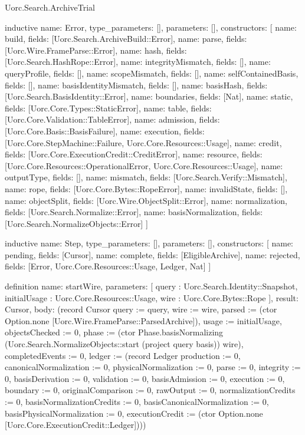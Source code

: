 \begin{lexlean}{Uorc.Search.ArchiveTrial}
\begin{semanticmodule}
inductive{
  name: Error,
  type_parameters: [],
  parameters: [],
  constructors: [
    {name: build, fields: [Uorc.Search.ArchiveBuild::Error]},
    {name: parse, fields: [Uorc.Wire.FrameParse::Error]},
    {name: hash, fields: [Uorc.Search.HashRope::Error]},
    {name: integrityMismatch, fields: []},
    {name: queryProfile, fields: []},
    {name: scopeMismatch, fields: []},
    {name: selfContainedBasis, fields: []},
    {name: basisIdentityMismatch, fields: []},
    {name: basisHash, fields: [Uorc.Search.BasisIdentity::Error]},
    {name: boundaries, fields: [Nat]},
    {name: static, fields: [Uorc.Core.Types::StaticError]},
    {name: table, fields: [Uorc.Core.Validation::TableError]},
    {name: admission, fields: [Uorc.Core.Basis::BasisFailure]},
    {name: execution, fields: [Uorc.Core.StepMachine::Failure, Uorc.Core.Resources::Usage]},
    {name: credit, fields: [Uorc.Core.ExecutionCredit::CreditError]},
    {name: resource, fields: [Uorc.Core.Resources::OperationalError, Uorc.Core.Resources::Usage]},
    {name: outputType, fields: []},
    {name: mismatch, fields: [Uorc.Search.Verify::Mismatch]},
    {name: rope, fields: [Uorc.Core.Bytes::RopeError]},
    {name: invalidState, fields: []},
    {name: objectSplit, fields: [Uorc.Wire.ObjectSplit::Error]},
    {name: normalization, fields: [Uorc.Search.Normalize::Error]},
    {name: basisNormalization, fields: [Uorc.Search.NormalizeObjects::Error]}
  ]
}

inductive{
  name: Step,
  type_parameters: [],
  parameters: [],
  constructors: [
    {name: pending, fields: [Cursor]},
    {name: complete, fields: [EligibleArchive]},
    {name: rejected, fields: [Error, Uorc.Core.Resources::Usage, Ledger, Nat]}
  ]
}

definition{
  name: startWire,
  parameters: [
    query : Uorc.Search.Identity::Snapshot,
    initialUsage : Uorc.Core.Resources::Usage,
    wire : Uorc.Core.Bytes::Rope
  ],
  result: Cursor,
  body: (record Cursor {query := query, wire := wire, parsed := (ctor Option.none [Uorc.Wire.FrameParse::ParsedArchive]), usage := initialUsage, objectsChecked := 0, phase := (ctor Phase.basisNormalizing (Uorc.Search.NormalizeObjects::start (project query basis)) wire), completedEvents := 0, ledger := (record Ledger {production := 0, canonicalNormalization := 0, physicalNormalization := 0, parse := 0, integrity := 0, basisDerivation := 0, validation := 0, basisAdmission := 0, execution := 0, boundary := 0, originalComparison := 0, rawOutput := 0, normalizationCredits := 0, basisNormalizationCredits := 0, basisCanonicalNormalization := 0, basisPhysicalNormalization := 0, executionCredit := (ctor Option.none [Uorc.Core.ExecutionCredit::Ledger])})})
}


\end{semanticmodule}
\end{lexlean}
